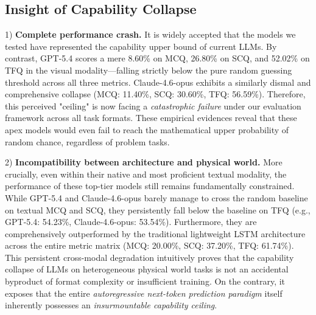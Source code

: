 \subsection{Insight of Capability Collapse}
\label{analysis}
1) \textbf{Complete performance crash.} 
It is widely accepted that the models we tested have represented the capability upper bound of current LLMs.
By contrast, GPT-5.4 scores a mere 8.60\% on MCQ, 26.80\% on SCQ, and 52.02\% on TFQ in the visual modality—falling strictly below the pure random guessing threshold across all three metrics.
Claude-4.6-opus exhibits a similarly dismal and comprehensive collapse (MCQ: 11.40\%, SCQ: 30.60\%, TFQ: 56.59\%).
Therefore, this perceived "ceiling" is now facing a \emph{catastrophic failure} under our evaluation framework across all task formats.
These empirical evidences reveal that these apex models would even fail to reach the mathematical upper probability of random chance, regardless of problem tasks.

2) \textbf{Incompatibility between architecture and physical world.}
More crucially, even within their native and most proficient textual modality, the performance of these top-tier models still remains fundamentally constrained. 
While GPT-5.4 and Claude-4.6-opus barely manage to cross the random baseline on textual MCQ and SCQ, they persistently fall below the baseline on TFQ (e.g., GPT-5.4: 54.23\%, Claude-4.6-opus: 53.54\%). 
Furthermore, they are comprehensively outperformed by the traditional lightweight LSTM architecture across the entire metric matrix (MCQ: 20.00\%, SCQ: 37.20\%, TFQ: 61.74\%).
This persistent cross-modal degradation intuitively proves that the capability collapse of LLMs on heterogeneous physical world tasks is not an accidental byproduct of format complexity or insufficient training.
On the contrary, it exposes that the entire \emph{autoregressive next-token prediction paradigm} itself inherently possesses an \emph{insurmountable capability ceiling}.


